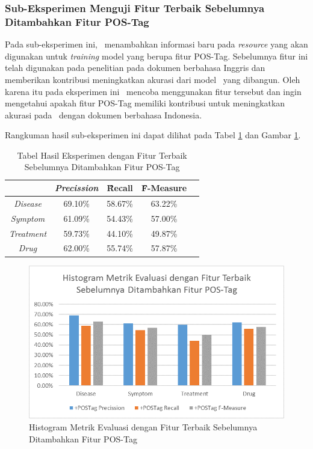 	\subsubsection{Sub-Eksperimen Menguji Fitur Terbaik Sebelumnya Ditambahkan Fitur POS-Tag}\label{eks:subekspostag}
	Pada sub-eksperimen ini, \saya~menambahkan informasi baru pada \textit{resource} yang akan digunakan untuk \textit{training} model yang berupa fitur POS-Tag. Sebelumnya fitur ini telah digunakan pada penelitian \cite{abacha2011medical} pada dokumen berbahasa Inggris dan memberikan kontribusi meningkatkan akurasi dari model \mer~yang dibangun. Oleh karena itu pada eksperimen ini \saya~mencoba menggunakan fitur tersebut dan ingin mengetahui apakah fitur POS-Tag memiliki kontribusi untuk meningkatkan akurasi pada \mer~dengan dokumen berbahasa Indonesia. 
	
	Rangkuman hasil sub-eksperimen ini dapat dilihat pada Tabel \ref{table:owndict4} dan Gambar \ref{fig:owndict4}.
	
	\begin{table}
		\centering
		\caption{Tabel Hasil Eksperimen dengan Fitur Terbaik Sebelumnya Ditambahkan Fitur POS-Tag}
		\begin{tabular}{|c|c|c|c|c|}
			\hline
								  & \textit{Precission} & \f{\f{Recall}} & \f{\f{F-Measure}} \\ \hline
			\textit{Disease}      & 69.10\%             & 58.67\%        & 63.22\%           \\ \hline
			\textit{Symptom}      & 61.09\%             & 54.43\%        & 57.00\%           \\ \hline
			\textit{Treatment}    & 59.73\%             & 44.10\%        & 49.87\%           \\ \hline
			\textit{Drug}		  & 62.00\%             & 55.74\%        & 57.87\%           \\ \hline
		\end{tabular}
		\label{table:owndict4}
	\end{table}
	
	\begin{figure}
		\centering
		\includegraphics[width=0.85\linewidth]{images/histogram4}
		\caption{Histogram Metrik Evaluasi dengan Fitur Terbaik Sebelumnya Ditambahkan Fitur POS-Tag}
		\label{fig:owndict4}
	\end{figure}
	
